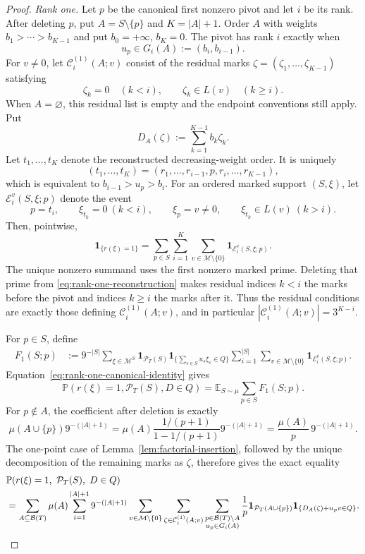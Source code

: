 \documentclass[11pt]{article}
\numberwithin{equation}{section}
\theoremstyle{plain}
\newcommand{\Pp}{\mathbb P}
\newcommand{\E}{\mathbb E}
\newcommand{\1}{\mathbf 1}
\newcommand{\cB}{\mathcal B}
\newcommand{\cM}{\mathcal M}
\begin{document}
\begin{proof}
\smallskip
\noindent\emph{Rank one.}
Let $p$ be the canonical first nonzero pivot and let $i$ be its rank.
After deleting $p$, put $A=S\setminus\{p\}$ and $K=|A|+1$.  Order $A$
with weights $b_1>\cdots>b_{K-1}$ and put
$b_0=+\infty$, $b_K=0$.  The pivot has rank $i$ exactly when
\[
 u_p\in G_i(A):=(b_i,b_{i-1}).
\]
For $v\ne0$, let $\mathcal C_i^{(1)}(A;v)$ consist of the residual marks
$\zeta=(\zeta_1,\ldots,\zeta_{K-1})$ satisfying
\[
 \zeta_k=0\quad(k<i),\qquad
 \zeta_k\in L(v)\quad(k\ge i).
\]
When $A=\varnothing$, this residual list is empty and the endpoint
conventions still apply.  Put
\[
 D_A(\zeta):=\sum_{k=1}^{K-1}b_k\zeta_k.
\]
Let $t_1,\ldots,t_K$ denote the reconstructed decreasing-weight order.
It is uniquely
\begin{equation}\label{eq:rank-one-reconstruction}
 (t_1,\ldots,t_K)
 =(r_1,\ldots,r_{i-1},p,r_i,\ldots,r_{K-1}),
\end{equation}
which is equivalent to $b_{i-1}>u_p>b_i$.  For an ordered marked support
$(S,\xi)$, let $\mathcal E_i^v(S,\xi;p)$ denote the event
\[
 p=t_i,\qquad
 \xi_{t_k}=0\ (k<i),\qquad
 \xi_p=v\ne0,\qquad
 \xi_{t_k}\in L(v)\ (k>i).
\]
Then, pointwise,
\begin{equation}\label{eq:rank-one-canonical-identity}
 \1_{\{r(\xi)=1\}}
 =
 \sum_{p\in S}\sum_{i=1}^K
 \sum_{v\in\cM\setminus\{0\}}
 \1_{\mathcal E_i^v(S,\xi;p)}.
\end{equation}
The unique nonzero summand uses the first nonzero marked prime.  Deleting
that prime from \eqref{eq:rank-one-reconstruction} makes residual indices
$k<i$ the marks before the pivot and indices $k\ge i$ the marks after it.
Thus the residual conditions are exactly those defining
$\mathcal C_i^{(1)}(A;v)$, and in particular
$|\mathcal C_i^{(1)}(A;v)|=3^{K-i}$.

For $p\in S$, define
\begin{align*}
 F_1(S;p)
 &:=
 9^{-|S|}\sum_{\xi\in\cM^S}
 \1_{\mathcal P_T(S)}
 \1_{\{\sum_{s\in S}u_s\xi_s\in Q\}}
 \sum_{i=1}^{|S|}
 \sum_{v\in\cM\setminus\{0\}}
 \1_{\mathcal E_i^v(S,\xi;p)}.
\end{align*}
Equation~\eqref{eq:rank-one-canonical-identity} gives
\[
 \Pp(r(\xi)=1,\mathcal P_T(S),D\in Q)
 =\E_{S\sim\mu}\sum_{p\in S}F_1(S;p).
\]
For $p\notin A$, the coefficient after deletion is exactly
\[
 \mu(A\cup\{p\})9^{-(|A|+1)}
 =\mu(A)\frac{1/(p+1)}{1-1/(p+1)}9^{-(|A|+1)}
 =\frac{\mu(A)}p\,9^{-(|A|+1)}.
\]
The one-point case of Lemma~\ref{lem:factorial-insertion}, followed by the
unique decomposition of the remaining marks as $\zeta$, therefore gives
the exact equality
\begin{align}
 &\Pp(r(\xi)=1,\ \mathcal P_T(S),\ D\in Q)\notag\\
 &=\sum_{A\subseteq\cB(T)}\mu(A)
   \sum_{i=1}^{|A|+1}9^{-(|A|+1)}
   \sum_{v\in\cM\setminus\{0\}}
   \sum_{\zeta\in\mathcal C_i^{(1)}(A;v)}
   \sum_{\substack{p\in\cB(T)\setminus A\\u_p\in G_i(A)}}\frac1p
   \1_{\mathcal P_T(A\cup\{p\})}
   \1_{\{D_A(\zeta)+u_pv\in Q\}}.
                                                        \label{eq:rank-one-exact}
\end{align}


\end{proof}
\end{document}

